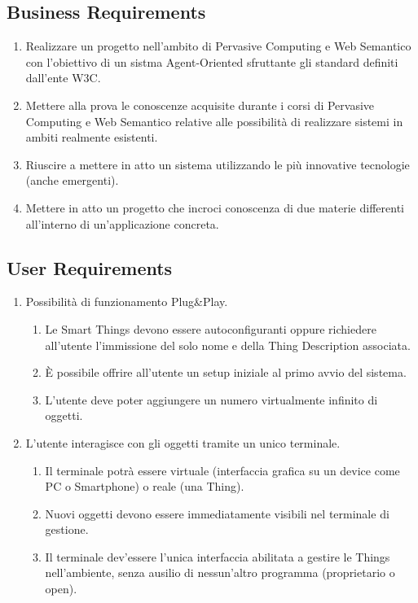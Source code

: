 \documentclass[12pt,a4paper,openright,oneside]{report}
\begin{document}
\subsection{Business Requirements}
\begin{enumerate}
	\item Realizzare un progetto nell'ambito di Pervasive Computing e Web Semantico con l'obiettivo di un sistma Agent-Oriented sfruttante gli standard definiti dall'ente W3C.
	
	\item Mettere alla prova le conoscenze acquisite durante i corsi di Pervasive Computing e Web Semantico relative alle possibilità di realizzare sistemi in ambiti realmente esistenti.
	
	\item Riuscire a mettere in atto un sistema utilizzando le più innovative tecnologie (anche emergenti).
	
	\item Mettere in atto un progetto che incroci conoscenza di due materie differenti all'interno di un'applicazione concreta.
\end{enumerate}

\subsection{User Requirements}
\begin{enumerate}
	\item Possibilità di funzionamento Plug\&Play.
	\begin{enumerate}[label*=\arabic*.]
		\item Le Smart Things devono essere autoconfiguranti oppure richiedere all'utente l'immissione del solo nome e della Thing Description associata.
		\item È possibile offrire all'utente un setup iniziale al primo avvio del sistema.
		\item L'utente deve poter aggiungere un numero virtualmente infinito di oggetti.
	\end{enumerate}
	
	\item L'utente interagisce con gli oggetti tramite un unico terminale.
	\begin{enumerate}[label*=\arabic*.]
		\item Il terminale potrà essere virtuale (interfaccia grafica su un device come PC o Smartphone) o reale (una Thing).
		\item Nuovi oggetti devono essere immediatamente visibili nel terminale di gestione.
		\item Il terminale dev'essere l'unica interfaccia abilitata a gestire le Things nell'ambiente, senza ausilio di nessun'altro programma (proprietario o open).
	\end{enumerate}
\end{enumerate}
\end{document}
